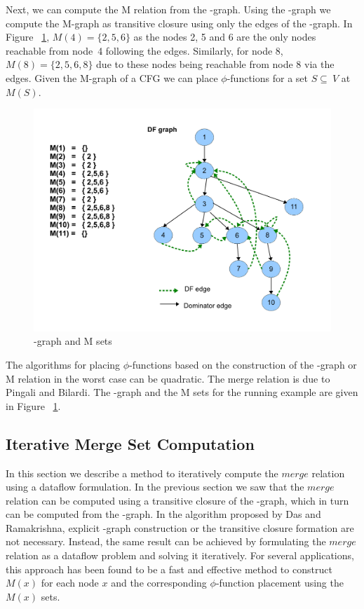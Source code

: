 {Next, we can compute the M relation from the \DF-graph. 
Using the \DF-graph we compute the M-graph as transitive closure
using only the \DF edges of the \DJ-graph. In Figure ~\ref{fig:mgraph}, $M(4) = \{2,5,6\}$ as the nodes 2, 5 and 6 are the only nodes reachable from node~4 following the \DF edges. Similarly, for node 8, $M(8) = \{2,5,6,8\}$ due to these nodes being reachable from node 8 via the \DF edges. Given the M-graph of a CFG we can place $\phi$-functions for a set $S \subseteq \ V$ at $M(S)$.

    \begin{figure}[htb]
    \centerline{\includegraphics[scale=0.4]{mgraph_1.pdf}}
    \caption{\DF-graph and M sets}
    \label{fig:mgraph}
    \end{figure} 

The algorithms for placing $\phi$-functions based on the construction of the \DF-graph or M relation 
in the worst case can be quadratic. The merge relation is due to Pingali and Bilardi. The \DF-graph and the M sets for the running example are given in Figure ~\ref{fig:mgraph}.

\subsection{Iterative Merge Set Computation}
In this section we describe a method to iteratively compute the $merge$ relation using a dataflow formulation. In the previous section we saw that the $merge$ relation can be computed using a transitive closure of the \DF-graph, which in turn can be computed from the \DJ-graph. In the algorithm proposed by Das and Ramakrishna, explicit \DF-graph construction or the transitive closure formation are not necessary. Instead, the same result can be achieved by formulating the $merge$ relation as a dataflow problem and solving it iteratively. For several applications, this approach has been found to be a fast and effective method to construct $M(x)$ for each node $x$ and the corresponding $\phi$-function placement using the $M(x)$ sets. 

}

